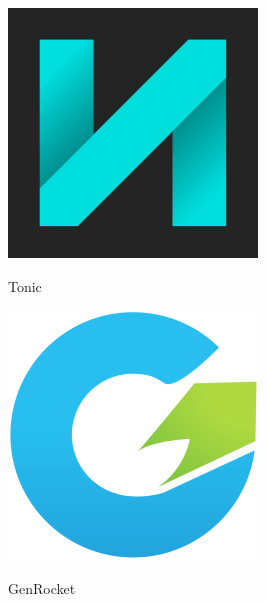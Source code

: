 \documentclass[
    aspectratio=169,
]{beamer}
\begin{document}
\begin{frame}[fragile]
\begin{minipage}[c]{0.35\textwidth}
\begin{minipage}[t]{0.48\textwidth}
            \includegraphics[width=0.7\linewidth, frame]{image/tonic}\par
            Tonic
        \end{minipage}%
        \hspace*{\fill}%
        \begin{minipage}[t]{0.48\textwidth}
            \includegraphics[width=0.7\linewidth, frame]{image/genrocket}\par
            GenRocket
            

\end{minipage}
\end{minipage}
\end{frame}
\end{document}
